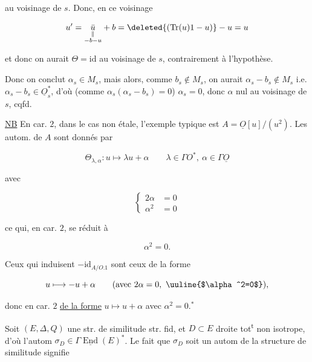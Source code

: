 
au voisinage de $s$. Donc, en ce voisinage

\[
u'=\underset{\substack{\Vert\\-b-u}}{\bar u}+b=\deleted{(\operatorname{Tr}(u)1-u)}-u=u
\]

et donc on aurait $\Theta=\mathrm{id}$ au voisinage de $s$, contrairement à l'hypothèse.

Donc on conclut $\alpha_s\in M_s$, mais alors, comme $b_s\notin M_s$,  on aurait $\alpha_s-b_s\notin M_s$ i.e. $\alpha_s-b_s\in\underline O_s^*$, d'où (comme $\alpha_s(\alpha_s-b_s)=0$) $\alpha_s=0$, donc $\alpha$ nul au voisinage de $s$, cqfd.

\uline{NB} En car. $2$, dans le cas non étale, l'exemple typique est $A=\underline O[u]/(u^2)$. Les autom. de $A$ sont donnés  par

\[
\Theta_{\lambda,\alpha}:u\longmapsto\lambda u+\alpha\qquad\lambda\in\Gamma O^*,\ \alpha\in\Gamma\underline O
\]

avec

\[
\left\{\begin{aligned}2\alpha&=0\\\alpha^2&=0\end{aligned}\right.
\]

ce qui, en car. $2$, se réduit à

\[
\alpha^2=0.
\]

Ceux qui induisent $-\mathrm{id}_{A/O.1}$ sont ceux de la forme

\[
u\longmapsto-u+\alpha\qquad(\text{avec }2\alpha=0,\ \text{\uuline{$\alpha^2=0$}}),
\]

donc en car. $2$  \uline{de la forme} $u\longmapsto u+\alpha$ avec $\alpha^2=0$.$^*$



Soit $(E,\Delta,Q)$ une str. de similitude str. fid, et $D\subset E$ droite tot\textsuperscript{t} non isotrope, d'où l'autom $\sigma_D\in\Gamma\underline{\operatorname{End}}(E)^*$. Le fait que $\sigma_D$ soit un autom de la structure de similitude signifie

